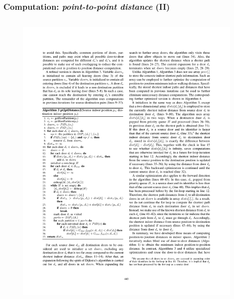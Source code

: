 \begin{frame}
\begin{columns}[c]
\end{columns}

\end{frame}


\begin{frame}
\frametitle{Computation: \emph{point-to-point distance} (II)}

\begin{columns}[c]

  \begin{figure}[tb]
    \includegraphics[width=\columnwidth]{figures/2-5/2-5-5.pdf}
  \end{figure}


\end{columns}
\end{frame}
